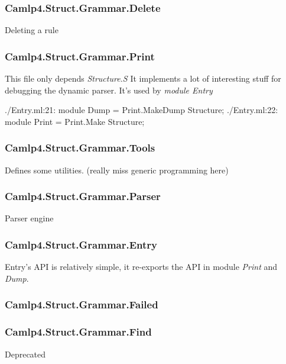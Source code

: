 \subsubsection{Camlp4.Struct.Grammar.Delete}
\label{Camlp4.Struct.Grammar.Delete}

Deleting a rule



\subsubsection{Camlp4.Struct.Grammar.Print}
\label{Camlp4.Struct.Grammar.Print}
This file only depends \textit{Structure.S} It implements a lot of
interesting stuff for debugging the dynamic parser. It's used by
\textit{module Entry}

\begin{ocamlcode}
./Entry.ml:21:  module Dump  = Print.MakeDump Structure;
./Entry.ml:22:  module Print = Print.Make Structure;
\end{ocamlcode}

\subsubsection{Camlp4.Struct.Grammar.Tools}
Defines some utilities. (really miss generic programming here)

\subsubsection{Camlp4.Struct.Grammar.Parser}
\label{Camlp4.Struct.Grammar.Parser}
Parser engine 

\subsubsection{Camlp4.Struct.Grammar.Entry}
\label{Camlp4.Struct.Grammar.Entry}
Entry's API is relatively simple, it re-exports the API in
module \textit{Print} and \textit{Dump}.


\subsubsection{Camlp4.Struct.Grammar.Failed}
\label{Camlp4.Struct.Grammar.Failed}

\subsubsection{Camlp4.Struct.Grammar.Find}
\label{Camlp4.Struct.Grammar.Find}
Deprecated

